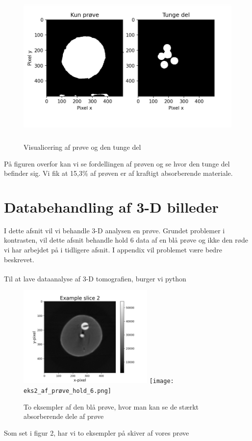 \documentclass[a4paper,twoside]{article}
\begin{document}
\begin{figure}[H]
\begin{centering}
\includegraphics[height=8cm]{2dtungogkunprøve.png}
\hspace{1cm}
\par\end{centering}
\caption{\label{cap:2ien} Visualicering af prøve og den tunge del}
\end{figure}
På figuren overfor kan vi se fordellingen af prøven og se hvor den tunge del befinder sig. Vi fik at 15,3\% af prøven er af kraftigt absorberende materiale. 
\section{Databehandling af 3-D billeder} 
I dette afsnit vil vi behandle 3-D analysen en prøve. Grundet problemer i kontrasten, vil dette afsnit behandle hold 6 data af en blå prøve og ikke den røde vi har arbejdet på i tidligere afsnit. I appendix vil problemet være bedre beskrevet. \\
\\
Til at lave dataanalyse af 3-D tomografien, burger vi python
\begin{figure}[H]
\begin{centering}
\includegraphics[height=5cm]{eks_af_prøve_blå_hold_6.png}
\texttt{[image: eks2\_af\_prøve\_hold\_6.png]}
\hspace{1cm}
\par\end{centering}
\caption{\label{cap:2ien} To eksempler af den blå prøve, hvor man kan se de stærkt absorberende dele af prøve}
\end{figure}
Som set i figur 2, har vi to eksempler på skiver af vores prøve
\end{document}

